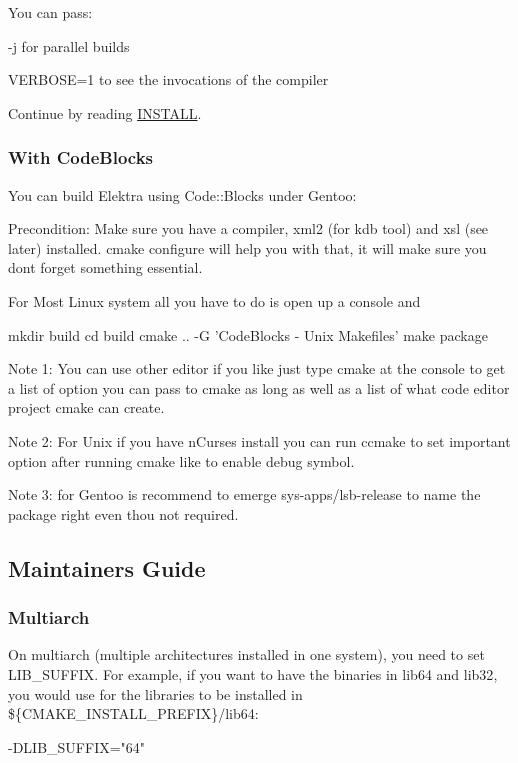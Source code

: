 You can pass\+:
\begin{DoxyItemize}
\item {\ttfamily -\/j} for parallel builds
\item {\ttfamily V\+E\+R\+B\+O\+SE=1} to see the invocations of the compiler
\end{DoxyItemize}

Continue by reading \hyperlink{doc_INSTALL_md}{I\+N\+S\+T\+A\+LL}.

\subsubsection*{With Code\+Blocks}

You can build Elektra using Code\+::\+Blocks under Gentoo\+:

Precondition\+: Make sure you have a compiler, xml2 (for kdb tool) and xsl (see later) installed. cmake configure will help you with that, it will make sure you don\textquotesingle{}t forget something essential.

For Most Linux system all you have to do is open up a console and \begin{DoxyVerb}mkdir build
cd build
cmake .. -G 'CodeBlocks - Unix Makefiles'
make package
\end{DoxyVerb}


Note 1\+: You can use other editor if you like just type cmake at the console to get a list of option you can pass to cmake as long as well as a list of what code editor project cmake can create.

Note 2\+: For Unix if you have n\+Curses install you can run ccmake to set important option after running cmake like to enable debug symbol.

Note 3\+: for Gentoo is recommend to emerge sys-\/apps/lsb-\/release to name the package right even thou not required.

\subsection*{Maintainer\textquotesingle{}s Guide}

\subsubsection*{Multiarch}

On multiarch (multiple architectures installed in one system), you need to set {\ttfamily L\+I\+B\+\_\+\+S\+U\+F\+F\+IX}. For example, if you want to have the binaries in {\ttfamily lib64} and {\ttfamily lib32}, you would use for the libraries to be installed in {\ttfamily \$\{C\+M\+A\+K\+E\+\_\+\+I\+N\+S\+T\+A\+L\+L\+\_\+\+P\+R\+E\+F\+IX\}/lib64}\+: \begin{DoxyVerb}    -DLIB_SUFFIX="64"
\end{DoxyVerb}


